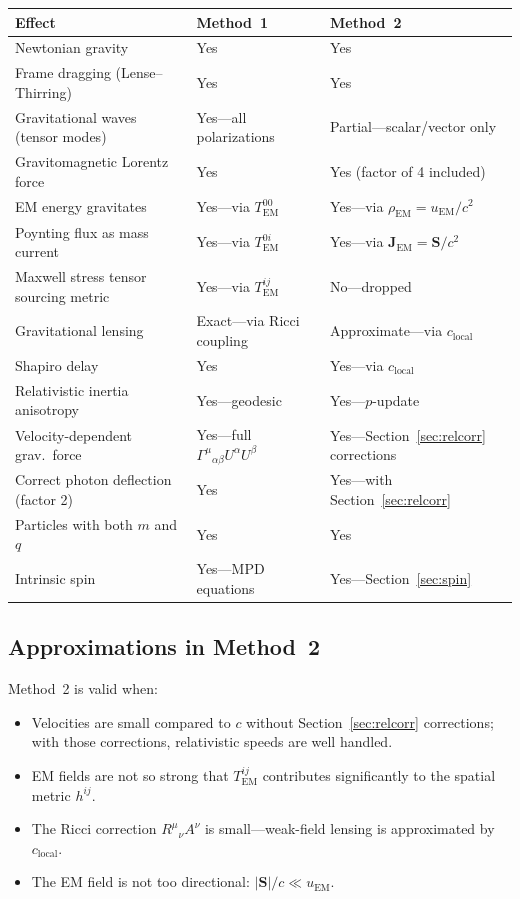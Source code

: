 \documentclass[11pt,a4paper]{article}
\newcommand{\vv}[1]{\mathbf{#1}}
\begin{document}
\begin{center}
\begin{tabular}{@{}L{4.5cm}L{3.0cm}L{5.5cm}@{}}
\toprule
\textbf{Effect} & \textbf{Method~1} & \textbf{Method~2} \\
\midrule
Newtonian gravity                     & Yes & Yes \\
Frame dragging (Lense--Thirring)      & Yes & Yes \\
Gravitational waves (tensor modes)    & Yes---all polarizations & Partial---scalar/vector only \\
Gravitomagnetic Lorentz force         & Yes & Yes (factor of 4 included) \\
EM energy gravitates                  & Yes---via $T^{00}_{\mathrm{EM}}$ & Yes---via $\rho_{\mathrm{EM}}=u_{\mathrm{EM}}/c^2$ \\
Poynting flux as mass current         & Yes---via $T^{0i}_{\mathrm{EM}}$ & Yes---via $\vv{J}_{\mathrm{EM}}=\vv{S}/c^2$ \\
Maxwell stress tensor sourcing metric & Yes---via $T^{ij}_{\mathrm{EM}}$ & No---dropped \\
Gravitational lensing                 & Exact---via Ricci coupling & Approximate---via $c_{\mathrm{local}}$ \\
Shapiro delay                         & Yes & Yes---via $c_{\mathrm{local}}$ \\
Relativistic inertia anisotropy       & Yes---geodesic & Yes---$p$-update \\
Velocity-dependent grav.\ force       & Yes---full $\Gamma^\mu{}_{\alpha\beta}U^\alpha U^\beta$ & Yes---Section~\ref{sec:relcorr} corrections \\
Correct photon deflection (factor 2)  & Yes & Yes---with Section~\ref{sec:relcorr} \\
Particles with both $m$ and $q$       & Yes & Yes \\
Intrinsic spin                        & Yes---MPD equations & Yes---Section~\ref{sec:spin} \\
\bottomrule
\end{tabular}
\end{center}

\subsection{Approximations in Method~2}

Method~2 is valid when:
\begin{itemize}
  \item Velocities are small compared to $c$ without Section~\ref{sec:relcorr} corrections; with those corrections, relativistic speeds are well handled.
  \item EM fields are not so strong that $T^{ij}_{\mathrm{EM}}$ contributes significantly to the spatial metric $h^{ij}$.
  \item The Ricci correction $R^\mu{}_\nu A^\nu$ is small---weak-field lensing is approximated by $c_{\mathrm{local}}$.
  \item The EM field is not too directional: $|\vv{S}|/c \ll u_{\mathrm{EM}}$.
\end{itemize}
\end{document}
